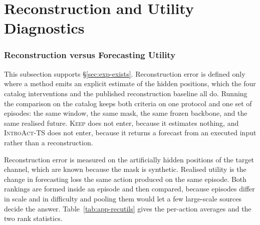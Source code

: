 \documentclass{article}
\newcommand{\introact}{\textsc{IntroAct-TS}}
\begin{document}
\section{Reconstruction and Utility Diagnostics}
\label{app:diagnostics}
\subsubsection{Reconstruction versus Forecasting Utility}
\label{app:recutils}
This subsection supports \S\ref{sec:exp-exists}. Reconstruction error is defined only where a
method emits an explicit estimate of the hidden positions, which the four catalog interventions
and the published reconstruction baseline all do. Running the comparison on the catalog keeps both criteria on one protocol and
one set of episodes: the same window, the same mask, the same frozen backbone, and the same
realised future. \textsc{Keep} does not enter, because it estimates nothing, and \introact{}
does not enter, because it returns a forecast from an executed input rather than a
reconstruction.

Reconstruction error is measured on the artificially hidden positions of the target channel,
which are known because the mask is synthetic. Realised utility is the change in forecasting
loss the same action produced on the same episode. Both rankings are formed inside an episode
and then compared, because episodes differ in scale and in difficulty and pooling them would
let a few large-scale sources decide the answer. Table~\ref{tab:app-recutils} gives the
per-action averages and the two rank statistics.
\end{document}
